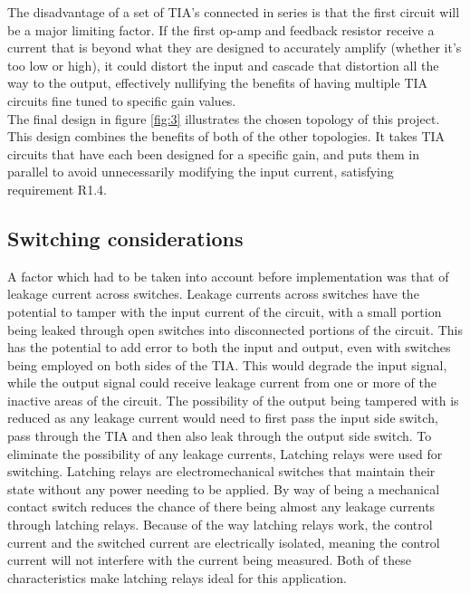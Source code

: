 \documentclass[conference]{IEEEtran}
\begin{document}
The disadvantage of a set of TIA’s connected in series is that the first circuit will be a major limiting factor. If the first op-amp and feedback resistor receive a current that is beyond what they are designed to accurately amplify (whether it’s too low or high), it could distort the input and cascade that distortion all the way to the output, effectively nullifying the benefits of having multiple TIA circuits fine tuned to specific gain values. \\

The final design in figure \ref{fig:3} illustrates the chosen topology of this project. This design combines the benefits of both of the other topologies. It takes TIA circuits that have each been designed for a specific gain, and puts them in parallel to avoid unnecessarily modifying the input current, satisfying requirement R1.4. \\

\subsection{Switching considerations}

A factor which had to be taken into account before implementation was that of leakage current across switches. Leakage currents across switches have the potential to tamper with the input current of the circuit, with a small portion being leaked through open switches into disconnected portions of the circuit. This has the potential to add error to both the input and output, even with switches being employed on both sides of the TIA. This would degrade the input signal, while the output signal could receive leakage current from one or more of the inactive areas of the circuit. The possibility of the output being tampered with is reduced as any leakage current would need to first pass the input side switch, pass through the TIA and then also leak through the output side switch.
To eliminate the possibility of any leakage currents, Latching relays were used for switching. Latching relays are electromechanical switches that maintain their state without any power needing to be applied. By way of being a mechanical contact switch reduces the chance of there being almost any leakage currents through latching relays. Because of the way latching relays work, the control current and the switched current are electrically isolated, meaning the control current will not interfere with the current being measured. Both of these characteristics make latching relays ideal for this application.\\
\end{document}
